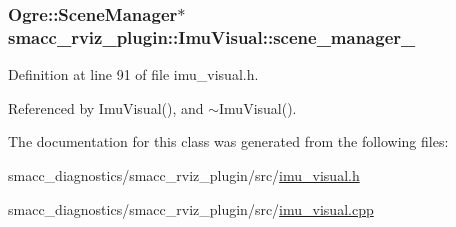 \subsubsection[{\texorpdfstring{scene\+\_\+manager\+\_\+}{scene_manager_}}]{\setlength{\rightskip}{0pt plus 5cm}Ogre\+::\+Scene\+Manager$\ast$ smacc\+\_\+rviz\+\_\+plugin\+::\+Imu\+Visual\+::scene\+\_\+manager\+\_\+\hspace{0.3cm}{\ttfamily [private]}}\hypertarget{classsmacc__rviz__plugin_1_1ImuVisual_acef4dba58d14224192bbed7eabbd6cbb}{}\label{classsmacc__rviz__plugin_1_1ImuVisual_acef4dba58d14224192bbed7eabbd6cbb}


Definition at line 91 of file imu\+\_\+visual.\+h.



Referenced by Imu\+Visual(), and $\sim$\+Imu\+Visual().



The documentation for this class was generated from the following files\+:\begin{DoxyCompactItemize}
\item 
smacc\+\_\+diagnostics/smacc\+\_\+rviz\+\_\+plugin/src/\hyperlink{imu__visual_8h}{imu\+\_\+visual.\+h}\item 
smacc\+\_\+diagnostics/smacc\+\_\+rviz\+\_\+plugin/src/\hyperlink{imu__visual_8cpp}{imu\+\_\+visual.\+cpp}\end{DoxyCompactItemize}
